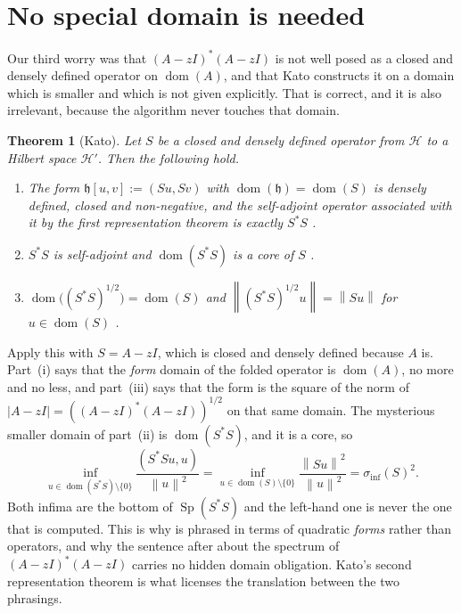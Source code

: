 \documentclass[11pt,a4paper]{article}
\theoremstyle{plain}
\newtheorem{theorem}{Theorem}[section]
\newcommand{\norm}[1]{\left\|#1\right\|}
\newcommand{\abs}[1]{\left|#1\right|}
\newcommand{\Hb}{\mathcal{H}}
\newcommand{\spec}{\sigma}
\DeclareMathOperator{\dom}{dom}
\DeclareMathOperator{\Sp}{Sp}
\newcommand{\siginf}{\spec_{\inf}}
\begin{document}
\section{No special domain is needed}
\label{sec:kato}

Our third worry was that $(A-zI)^*(A-zI)$ is not well posed as a closed and
densely defined operator on $\dom(A)$, and that Kato constructs it on a domain
which is smaller and which is not given explicitly.  That is correct, and it is
also irrelevant, because the algorithm never touches that domain.

\begin{theorem}[Kato]
  \label{thm:kato}
  Let $S$ be a closed and densely defined operator from $\Hb$ to a Hilbert space
  $\Hb'$.  Then the following hold.
  \begin{enumerate}
    \item[(i)] The form $\mathfrak{h}[u,v] := (Su,Sv)$ with
      $\dom(\mathfrak{h}) = \dom(S)$ is densely defined, closed and
      non-negative, and the self-adjoint operator associated with it by the
      first representation theorem is exactly $S^*S$
      \cite[Example~VI.2.13, p.~326]{Kato1995}.
    \item[(ii)] $S^*S$ is self-adjoint and $\dom(S^*S)$ is a \emph{core} of $S$
      \cite[Theorem~V.3.24, p.~275]{Kato1995}.
    \item[(iii)] $\dom\bigl((S^*S)^{1/2}\bigr) = \dom(S)$ and
      $\norm{(S^*S)^{1/2}u} = \norm{Su}$ for $u \in \dom(S)$
      \cite[Theorem~VI.2.23 and Equation~(VI.2.22), pp.~331 and 334]{Kato1995}.
  \end{enumerate}
\end{theorem}

Apply this with $S = A - zI$, which is closed and densely defined because $A$
is.  Part~(i) says that the \emph{form} domain of the folded operator is
$\dom(A)$, no more and no less, and part~(iii) says that the form is the square
of the norm of $\abs{A - zI} = ((A-zI)^*(A-zI))^{1/2}$ on that same domain.  The
mysterious smaller domain of part~(ii) is $\dom(S^*S)$, and it is a core, so
\begin{equation}
  \label{eq:coreirrelevant}
  \inf_{u \in \dom(S^*S)\setminus\{0\}} \frac{(S^*Su,u)}{\norm{u}^2}
  = \inf_{u \in \dom(S)\setminus\{0\}} \frac{\norm{Su}^2}{\norm{u}^2}
  = \siginf(S)^2 .
\end{equation}
Both infima are the bottom of $\Sp(S^*S)$ and the left-hand one is never the one
that is computed.  This is why \cite[\S3.4.1]{Colbrook2026} is phrased in terms
of quadratic \emph{forms} rather than operators, and why the sentence after
\cite[Equation~(3.26)]{Colbrook2026} about the spectrum of $(A-zI)^*(A-zI)$
carries no hidden domain obligation.  Kato's second representation theorem is
what licenses the translation between the two phrasings.
\end{document}
